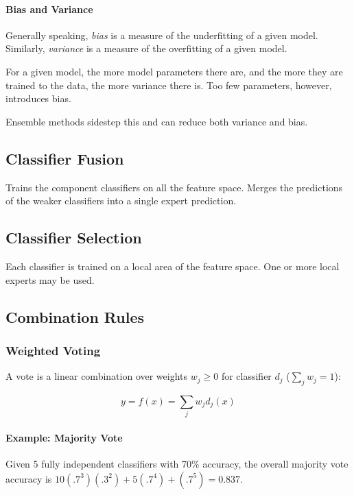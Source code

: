 \documentclass{idc_msc}
\begin{document}
\paragraph{Bias and Variance}

Generally speaking, \emph{bias} is a measure of the underfitting of a given model.
Similarly, \emph{variance} is a measure of the overfitting of a given model.

For a given model, the more model parameters there are, and the more they are trained to the data, the more variance there is.
Too few parameters, however, introduces bias.

Ensemble methods sidestep this and can reduce both variance and bias.

\subsection{Classifier Fusion}

Trains the component classifiers on all the feature space.
Merges the predictions of the weaker classifiers into a single expert prediction.

\subsection{Classifier Selection}

Each classifier is trained on a local area of the feature space.
One or more local experts may be used.

\subsection{Combination Rules}

\subsubsection{Weighted Voting}

A vote is a linear combination over weights \(w_j \ge 0\) for classifier \(d_j\) (\(\sum_j w_j = 1\)):

\[y = f(x) = \sum_j w_j d_j(x)\]

\paragraph{Example: Majority Vote}

Given 5 fully independent classifiers with 70\% accuracy, the overall majority vote accuracy is \(10 (.7^3)(.3^2)+5(.7^4)+(.7^5)=0.837\).
\end{document}
